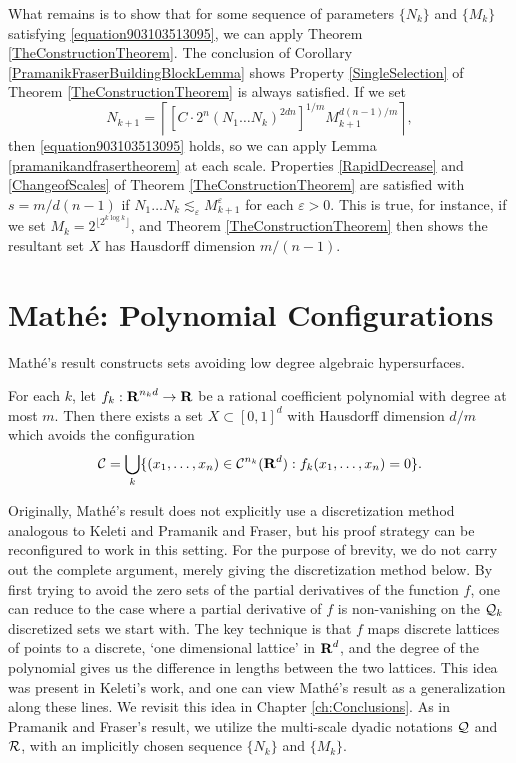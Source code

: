 What remains is to show that for some sequence of parameters $\{ N_k \}$ and $\{ M_k \}$ satisfying \eqref{equation903103513095}, we can apply Theorem \ref{TheConstructionTheorem}. The conclusion of Corollary \ref{PramanikFraserBuildingBlockLemma} shows Property \ref{SingleSelection} of Theorem \ref{TheConstructionTheorem} is always satisfied. If we set
%
\[ N_{k+1} = \left\lceil \left[ C \cdot 2^n (N_1 \dots N_k)^{2dn} \right]^{1/m} M_{k+1}^{d(n-1)/m} \right\rceil, \]
%
then \eqref{equation903103513095} holds, so we can apply Lemma \ref{pramanikandfrasertheorem} at each scale. Properties \ref{RapidDecrease} and \ref{ChangeofScales} of Theorem \ref{TheConstructionTheorem} are satisfied with $s = m/d(n-1)$ if $N_1 \dots N_k \lesssim_\varepsilon M_{k+1}^\varepsilon$ for each $\varepsilon > 0$. This is true, for instance, if we set $M_k = 2^{\lfloor 2^{k \log k} \rfloor}$, and Theorem \ref{TheConstructionTheorem} then shows the resultant set $X$ has Hausdorff dimension $m/(n-1)$.

\section{Math\'{e}: Polynomial Configurations}

Math\'{e}'s result \cite{Mathe} constructs sets avoiding low degree algebraic hypersurfaces.

\begin{theorem}[Math\'{e}] \label{mathemainresult}
    For each $k$, let $f_k: \operatorname{\mathbf{R}}^{n_k d} \to \operatorname{\mathbf{R}}$ be a rational coefficient polynomial with degree at most $m$. Then there exists a set $X \subset [0,1]^d$ with Hausdorff dimension $d/m$ which avoids the configuration
    \[ \operatorname{\mathcal{C}} = \bigcup_k \{ (x_1, \dots, x_n) \in \operatorname{\mathcal{C}}^{n_k}(\operatorname{\mathbf{R}}^d) : f_k(x_1, \dots, x_n) = 0 \}. \]
\end{theorem}

Originally, Math\'{e}'s result does not explicitly use a discretization method analogous to Keleti and Pramanik and Fraser, but his proof strategy can be reconfigured to work in this setting. For the purpose of brevity, we do not carry out the complete argument, merely giving the discretization method below. By first trying to avoid the zero sets of the partial derivatives of the function $f$, one can reduce to the case where a partial derivative of $f$ is non-vanishing on the $\operatorname{\mathcal{Q}}_k$ discretized sets we start with. The key technique is that $f$ maps discrete lattices of points to a discrete, `one dimensional lattice' in $\operatorname{\mathbf{R}}^d$, and the degree of the polynomial gives us the difference in lengths between the two lattices. This idea was present in Keleti's work, and one can view Math\'{e}'s result as a generalization along these lines. We revisit this idea in Chapter \ref{ch:Conclusions}. As in Pramanik and Fraser's result, we utilize the multi-scale dyadic notations $\operatorname{\mathcal{Q}}$ and $\operatorname{\mathcal{R}}$, with an implicitly chosen sequence $\{ N_k \}$ and $\{ M_k \}$.

